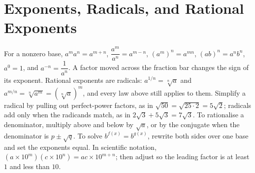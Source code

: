 \chapter{Exponents, Radicals, and Rational Exponents}

\begin{essentials}
For a nonzero base, $a^{m}a^{n}=a^{m+n}$, $\dfrac{a^{m}}{a^{n}}=a^{m-n}$,
$(a^{m})^{n}=a^{mn}$, $(ab)^{n}=a^{n}b^{n}$, $a^{0}=1$, and
$a^{-n}=\dfrac{1}{a^{n}}$. A factor moved across the fraction bar changes the
sign of its exponent. Rational exponents are radicals:
$a^{1/n}=\sqrt[n]{a}$ and $a^{m/n}=\sqrt[n]{a^{m}}=\left(\sqrt[n]{a}\right)^{m}$,
and every law above still applies to them. Simplify a radical by pulling out
perfect-power factors, as in $\sqrt{50}=\sqrt{25\cdot 2}=5\sqrt{2}$; radicals
add only when the radicands match, as in $2\sqrt{3}+5\sqrt{3}=7\sqrt{3}$. To
rationalise a denominator, multiply above and below by $\sqrt{a}$, or by the
conjugate when the denominator is $p\pm\sqrt{q}$. To solve $b^{f(x)}=b^{g(x)}$,
rewrite both sides over one base and set the exponents equal. In scientific
notation, $(a\times 10^{m})(c\times 10^{n})=ac\times 10^{m+n}$; then adjust so
the leading factor is at least $1$ and less than $10$.
\end{essentials}

